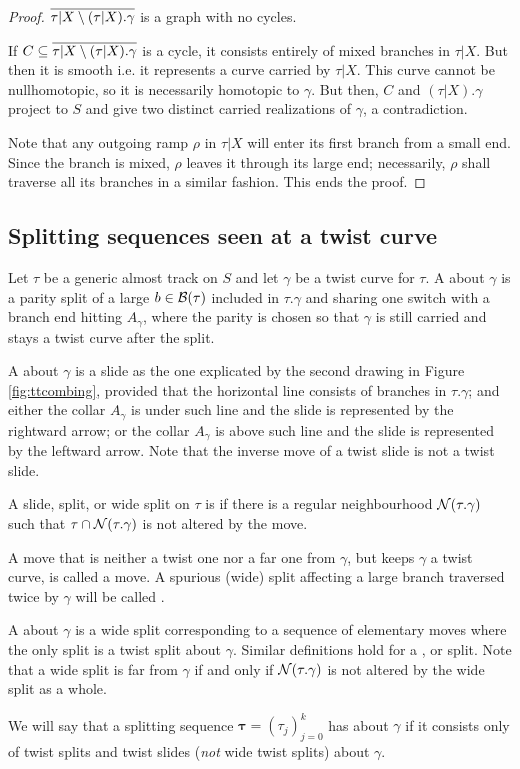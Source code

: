 \begin{proof}
 $\overline{\tau|X\setminus (\tau|X).\gamma}$ is a graph with no cycles.

If $C\subseteq \overline{\tau|X\setminus (\tau|X).\gamma}$ is a cycle, it consists entirely of mixed branches in $\tau|X$. But then it is smooth i.e. it represents a curve carried by $\tau|X$. This curve cannot be nullhomotopic, so it is necessarily homotopic to $\gamma$. But then, $C$ and $(\tau|X).\gamma$ project to $S$ and give two distinct carried realizations of $\gamma$, a contradiction.

Note that any outgoing ramp $\rho$ in $\tau|X$ will enter its first branch from a small end. Since the branch is mixed, $\rho$ leaves it through its large end; necessarily, $\rho$ shall traverse all its branches in a similar fashion. This ends the proof.
\end{proof}

\subsection{Splitting sequences seen at a twist curve}
\begin{defin}\label{def:twistmoves}
Let $\tau$ be a generic almost track on $S$ and let $\gamma$ be a twist curve for $\tau$. A  about $\gamma$ is a parity split of a large $b\in\mathcal B(\tau)$ included in $\tau.\gamma$ and sharing one switch with a branch end hitting $A_\gamma$, where the parity is chosen so that $\gamma$ is still carried and stays a twist curve after the split.

A  about $\gamma$ is a slide as the one explicated by the second drawing in Figure \ref{fig:ttcombing}, provided that the horizontal line consists of branches in $\tau.\gamma$; and either the collar $A_\gamma$ is under such line and the slide is represented by the rightward arrow; or the collar $A_\gamma$ is above such line and the slide is represented by the leftward arrow. Note that the inverse move of a twist slide is not a twist slide.

A slide, split, or wide split on $\tau$ is  if there is a regular neighbourhood ${\mathcal N}(\tau.\gamma)$ such that $\tau\cap{\mathcal N}(\tau.\gamma)$ is not altered by the move. 

A move that is neither a twist one nor a far one from $\gamma$, but keeps $\gamma$ a twist curve, is called a  move. A spurious (wide) split affecting a large branch traversed twice by $\gamma$ will be called .

A  about $\gamma$ is a wide split corresponding to a sequence of elementary moves where the only split is a twist split about $\gamma$. Similar definitions hold for a ,  or  split. Note that a wide split is far from $\gamma$ if and only if ${\mathcal N}(\tau.\gamma)$ is not altered by the wide split as a whole.

We will say that a splitting sequence $\bm\tau=(\tau_j)_{j=0}^k$ has  about $\gamma$ if it consists only of twist splits and twist slides (\emph{not} wide twist splits) about $\gamma$.
\end{defin}

